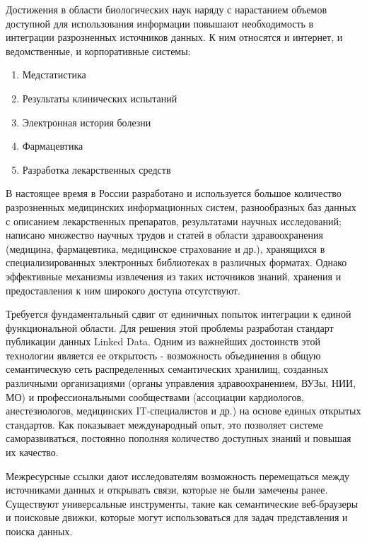 \documentclass[specialist,subf,href,colorlinks=true
]{disser}
\begin{document}
\tableofcontents %

\intro

Достижения в области биологических наук наряду с нарастанием объемов доступной для использования информации повышают необходимость в интеграции разрозненных источников данных. К ним относятся и интернет, и ведомственные, и корпоративные системы:
\begin{enumerate}
\item Медстатистика
\item Результаты клинических испытаний
\item Электронная история болезни
\item Фармацевтика
\item Разработка лекарственных средств
\end{enumerate}

В настоящее время в России разработано и используется большое количество разрозненных медицинских информационных систем, разнообразных баз данных с описанием лекарственных препаратов, результатами научных исследований; написано множество научных трудов и статей в области здравоохранения (медицина, фармацевтика, медицинское страхование и др.), хранящихся в специализированных электронных библиотеках в различных форматах. Однако эффективные механизмы извлечения из таких источников знаний, хранения и предоставления к ним широкого доступа отсутствуют.

Требуется фундаментальный сдвиг от единичных попыток интеграции к единой функциональной области. Для решения этой проблемы разработан стандарт публикации данных Linked Data. Одним из важнейших достоинств этой технологии является ее открытость - возможность объединения в общую семантическую сеть распределенных семантических хранилищ, созданных различными организациями (органы управления здравоохранением, ВУЗы, НИИ, МО) и профессиональными сообществами (ассоциации кардиологов, анестезиологов, медицинских IT-специалистов и др.) на основе единых открытых стандартов. Как показывает международный опыт, это позволяет системе саморазвиваться, постоянно пополняя количество доступных знаний и повышая их качество.

Межресурсные ссылки дают исследователям возможность перемещаться между источниками данных и открывать связи, которые не были замечены ранее. Существуют универсальные инструменты, такие как семантические веб-браузеры и поисковые движки, которые могут использоваться для задач представления и поиска данных.
\end{document}
